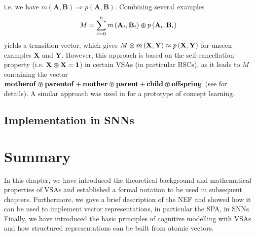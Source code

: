 i.e. we have $m\left(\mathbf{A}, \mathbf{B}\right) \Longrightarrow p\left(\mathbf{A}, \mathbf{B}\right)$.
Combining several examples
\begin{equation*}
	M = \sum_{i=0}^{n} m\left(\mathbf{A}_i, \mathbf{B}_i \right) \varoast p\left(\mathbf{A}_i, \mathbf{B}_i \right)
\end{equation*}
yields a transition vector, which gives $ M \varoast m \left(\mathbf{X}, \mathbf{Y} \right) \approx p \left(\mathbf{X}, \mathbf{Y} \right)$ for unseen examples $\mathbf{X}$ and $\mathbf{Y}$.
However, this approach is based on the self-cancellation property (i.e. $\mathbf{X} \varoast \mathbf{X} = \pmb{1}$) in certain \acp{VSA} (in particular  \acp{BSC}), as it leads to $M$ containing the vector $\mathbf{motherof} \varoast \mathbf{parentof} + \mathbf{mother} \varoast \mathbf{parent} + \mathbf{child} \varoast \mathbf{offspring}$ (see \cite{Kanerva2000} for details).
A similar approach was used in \cite{Kleyko2015a} for a prototype of concept learning.
\subsection{Implementation in \aclp{SNN}}

\section{Summary}
In this chapter, we have introduced the theoretical background and mathematical properties of \aclp{VSA} and established a formal notation to be used in subsequent chapters.
Furthermore, we gave a brief description of the \acl{NEF} and showed how it can be used to implement vector representations, in particular the \acl{SPA}, in \aclp{SNN}.
Finally, we have introduced the basic principles of cognitive modelling with \acp{VSA} and how structured representations can be built from atomic vectors.
